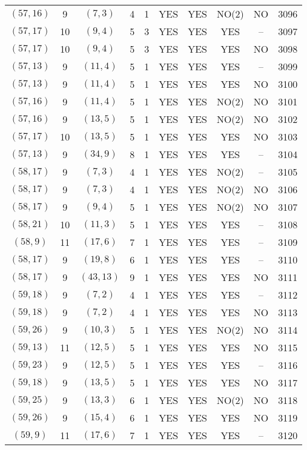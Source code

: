 \begin{longtable}{|c|c|c|c|c|c|c|c|c|c|}
$(57, 16)$ & 9 & $(7, 3)$ & 4 & 1 & YES & YES & NO(2) & NO & 3096\\
$(57, 17)$ & 10 & $(9, 4)$ & 5 & 3 & YES & YES & YES & -- & 3097\\
$(57, 17)$ & 10 & $(9, 4)$ & 5 & 3 & YES & YES & YES & NO & 3098\\
$(57, 13)$ & 9 & $(11, 4)$ & 5 & 1 & YES & YES & YES & -- & 3099\\
$(57, 13)$ & 9 & $(11, 4)$ & 5 & 1 & YES & YES & YES & NO & 3100\\
$(57, 16)$ & 9 & $(11, 4)$ & 5 & 1 & YES & YES & NO(2) & NO & 3101\\
$(57, 16)$ & 9 & $(13, 5)$ & 5 & 1 & YES & YES & NO(2) & NO & 3102\\
$(57, 17)$ & 10 & $(13, 5)$ & 5 & 1 & YES & YES & YES & NO & 3103\\
$(57, 13)$ & 9 & $(34, 9)$ & 8 & 1 & YES & YES & YES & -- & 3104\\
$(58, 17)$ & 9 & $(7, 3)$ & 4 & 1 & YES & YES & NO(2) & -- & 3105\\
$(58, 17)$ & 9 & $(7, 3)$ & 4 & 1 & YES & YES & NO(2) & NO & 3106\\
$(58, 17)$ & 9 & $(9, 4)$ & 5 & 1 & YES & YES & NO(2) & NO & 3107\\
$(58, 21)$ & 10 & $(11, 3)$ & 5 & 1 & YES & YES & YES & -- & 3108\\
$(58, 9)$ & 11 & $(17, 6)$ & 7 & 1 & YES & YES & YES & -- & 3109\\
$(58, 17)$ & 9 & $(19, 8)$ & 6 & 1 & YES & YES & YES & -- & 3110\\
$(58, 17)$ & 9 & $(43, 13)$ & 9 & 1 & YES & YES & YES & NO & 3111\\
$(59, 18)$ & 9 & $(7, 2)$ & 4 & 1 & YES & YES & YES & -- & 3112\\
$(59, 18)$ & 9 & $(7, 2)$ & 4 & 1 & YES & YES & YES & NO & 3113\\
$(59, 26)$ & 9 & $(10, 3)$ & 5 & 1 & YES & YES & NO(2) & NO & 3114\\
$(59, 13)$ & 11 & $(12, 5)$ & 5 & 1 & YES & YES & YES & NO & 3115\\
$(59, 23)$ & 9 & $(12, 5)$ & 5 & 1 & YES & YES & YES & -- & 3116\\
$(59, 18)$ & 9 & $(13, 5)$ & 5 & 1 & YES & YES & YES & NO & 3117\\
$(59, 25)$ & 9 & $(13, 3)$ & 6 & 1 & YES & YES & NO(2) & NO & 3118\\
$(59, 26)$ & 9 & $(15, 4)$ & 6 & 1 & YES & YES & YES & NO & 3119\\
$(59, 9)$ & 11 & $(17, 6)$ & 7 & 1 & YES & YES & YES & -- & 3120\\

\end{longtable}
